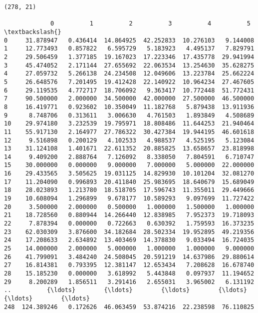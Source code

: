 \documentclass[11pt]{article}
\begin{document}
    \begin{Verbatim}[commandchars=\\\{\}]
(278, 21)

             0          1          2          3          4          5   \textbackslash{}
0     31.878947   0.436414  14.864925  42.252833  10.276103   9.144008   
1     12.773493   0.857822   6.595729   5.183923   4.495137   7.829791   
2     29.506459   1.377185  19.167023  17.223346  17.435778  29.941994   
3     45.474052   2.171144  27.655692  22.063534  13.254630  35.628275   
4     27.059732   5.266138  24.234508  12.049606  13.223784  25.662224   
5     26.648576   7.201495  19.412428  22.140922  10.964234  27.467605   
6     29.119535   4.772717  18.706092   9.363417  10.772448  51.772431   
7     90.500000   2.000000  34.500000  42.000000  27.500000  46.500000   
8     16.419771   0.923602  10.350049  11.182768   5.879438  13.911936   
9      8.748706   0.313611   3.006630   4.761503   1.893849   4.508689   
10    29.974180   3.232539  19.795971  18.808486  11.644253  21.940464   
11    55.917130   2.164977  27.786322  30.427384  19.944195  46.601618   
12     9.516898   0.200129   4.102533   4.988537   4.525195   5.123084   
13    31.124108   1.401671  22.611352  20.885825  13.658657  23.818998   
14     9.409200   2.888764   7.126092   8.338050   7.804591   6.710747   
15    30.000000   0.000000   9.000000   7.000000   5.000000  22.000000   
16    29.433565   3.505625  19.031125  14.829930  10.101204  32.081270   
17    11.204090   0.996893  20.411840  25.983695  18.640679  15.689049   
18    28.023893   1.213780  18.518705  17.596743  11.355011  29.449666   
19    10.608094   1.296899   9.678177  10.589293   9.097699  11.727422   
20     3.500000   2.000000   0.500000   1.000000   1.500000   1.000000   
21    18.728560   0.880944  14.266440  12.838985   7.952373  19.718093   
22     7.878394   0.000000   0.722663   0.630392   1.759593  16.373235   
23    62.030309   3.876600  34.182684  28.502334  19.952895  49.219356   
24    17.208633   2.634892  13.403469  14.378830   9.033494  16.724035   
25    14.000000   2.000000   5.000000   1.000000   1.000000   9.000000   
26    41.799091   3.484240  24.508045  20.591219  14.637986  29.880614   
27    16.814381   0.793395  12.381147  12.653434   7.208628  16.678740   
28    15.185230   0.000000   3.618992   5.443848   0.097937  11.194652   
29     8.200289   1.856511   3.291416   2.655031   3.965002   6.131192   
..          {\ldots}        {\ldots}        {\ldots}        {\ldots}        {\ldots}        {\ldots}   
248  124.389246   0.172626  46.063459  53.874216  22.238598  76.110825   

\end{Verbatim}
\end{document}
